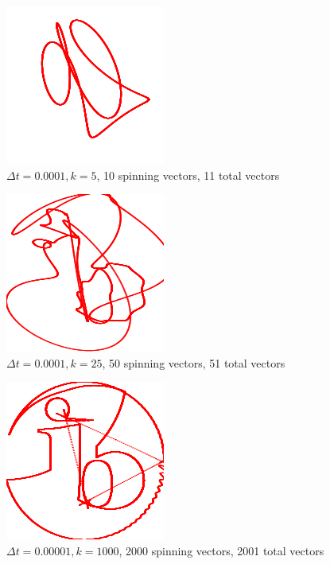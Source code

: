 \documentclass[letterpaper, 12pt]{article}
\begin{document}
\begin{figure}[H]
    \centering
    \includegraphics[width=.5\textwidth]{5.png}
    \caption{\protect\(\Delta t = 0.0001, k = 5\), 10 spinning vectors, 11 total vectors}
\end{figure}

\begin{figure}[H]
    \centering
    \includegraphics[width=.5\textwidth]{25.png}
    \caption{\protect\(\Delta t = 0.0001, k = 25\), 50 spinning vectors, 51 total vectors}
\end{figure}

\begin{figure}[H]
    \centering
    \includegraphics[width=.5\textwidth]{1000.png}
    \caption{\protect\(\Delta t = 0.00001, k = 1000\), 2000 spinning vectors, 2001 total vectors}
\end{figure}
\end{document}
